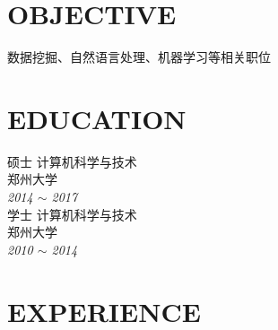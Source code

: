 \documentclass[line, margin]{res}
\begin{document}
\address{likun@stu.zzu.edu.cn}
\address{152-251-11797}

\begin{resume}
\section{OBJECTIVE}
{ 数据挖掘、自然语言处理、机器学习等相关职位}

\section{EDUCATION} 
 { 硕士 计算机科学与技术  \\
 郑州大学 }\\
 {\sl 2014 $\sim$ 2017} \\
[15pt]
 { 学士 计算机科学与技术 \\
 郑州大学 } \\
 {\sl 2010 $\sim$ 2014 }
 
\section{EXPERIENCE}


\end{resume}
\end{document}
